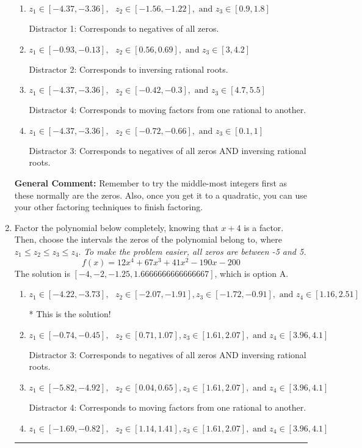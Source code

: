 \documentclass{extbook}[14pt]
\newcommand{\litem}[1]{\item #1

\rule{\textwidth}{0.4pt}}
\begin{document}
\begin{enumerate}
{\begin{enumerate}[label=\Alph*.]
* This is the solution!
\item \( z_1 \in [-4.37, -3.36], \text{   }  z_2 \in [-1.56, -1.22], \text{   and   } z_3 \in [0.9, 1.8] \)

 Distractor 1: Corresponds to negatives of all zeros.
\item \( z_1 \in [-0.93, -0.13], \text{   }  z_2 \in [0.56, 0.69], \text{   and   } z_3 \in [3, 4.2] \)

 Distractor 2: Corresponds to inversing rational roots.
\item \( z_1 \in [-4.37, -3.36], \text{   }  z_2 \in [-0.42, -0.3], \text{   and   } z_3 \in [4.7, 5.5] \)

 Distractor 4: Corresponds to moving factors from one rational to another.
\item \( z_1 \in [-4.37, -3.36], \text{   }  z_2 \in [-0.72, -0.66], \text{   and   } z_3 \in [0.1, 1] \)

 Distractor 3: Corresponds to negatives of all zeros AND inversing rational roots.
\end{enumerate}

\textbf{General Comment:} Remember to try the middle-most integers first as these normally are the zeros. Also, once you get it to a quadratic, you can use your other factoring techniques to finish factoring.
}
\litem{
Factor the polynomial below completely, knowing that $x+4$ is a factor. Then, choose the intervals the zeros of the polynomial belong to, where $z_1 \leq z_2 \leq z_3 \leq z_4$. \textit{To make the problem easier, all zeros are between -5 and 5.}
\[ f(x) = 12x^{4} +67 x^{3} +41 x^{2} -190 x -200 \]The solution is \( [-4, -2, -1.25, 1.6666666666666667] \), which is option A.\begin{enumerate}[label=\Alph*.]
\item \( z_1 \in [-4.22, -3.73], \text{   }  z_2 \in [-2.07, -1.91], z_3 \in [-1.72, -0.91], \text{   and   } z_4 \in [1.16, 2.51] \)

* This is the solution!
\item \( z_1 \in [-0.74, -0.45], \text{   }  z_2 \in [0.71, 1.07], z_3 \in [1.61, 2.07], \text{   and   } z_4 \in [3.96, 4.1] \)

 Distractor 3: Corresponds to negatives of all zeros AND inversing rational roots.
\item \( z_1 \in [-5.82, -4.92], \text{   }  z_2 \in [0.04, 0.65], z_3 \in [1.61, 2.07], \text{   and   } z_4 \in [3.96, 4.1] \)

 Distractor 4: Corresponds to moving factors from one rational to another.
\item \( z_1 \in [-1.69, -0.82], \text{   }  z_2 \in [1.14, 1.41], z_3 \in [1.61, 2.07], \text{   and   } z_4 \in [3.96, 4.1] \)


\end{enumerate}}
\end{enumerate}
\end{document}

